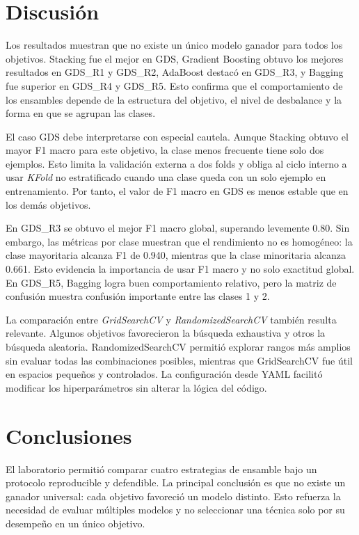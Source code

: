 \documentclass[conference]{IEEEtran}
\begin{document}
\section{Discusión}
Los resultados muestran que no existe un único modelo ganador para todos los objetivos. Stacking fue el mejor en GDS, Gradient Boosting obtuvo los mejores resultados en GDS\_R1 y GDS\_R2, AdaBoost destacó en GDS\_R3, y Bagging fue superior en GDS\_R4 y GDS\_R5. Esto confirma que el comportamiento de los ensambles depende de la estructura del objetivo, el nivel de desbalance y la forma en que se agrupan las clases.

El caso GDS debe interpretarse con especial cautela. Aunque Stacking obtuvo el mayor F1 macro para este objetivo, la clase menos frecuente tiene solo dos ejemplos. Esto limita la validación externa a dos folds y obliga al ciclo interno a usar \textit{KFold} no estratificado cuando una clase queda con un solo ejemplo en entrenamiento. Por tanto, el valor de F1 macro en GDS es menos estable que en los demás objetivos.

En GDS\_R3 se obtuvo el mejor F1 macro global, superando levemente 0.80. Sin embargo, las métricas por clase muestran que el rendimiento no es homogéneo: la clase mayoritaria alcanza F1 de 0.940, mientras que la clase minoritaria alcanza 0.661. Esto evidencia la importancia de usar F1 macro y no solo exactitud global. En GDS\_R5, Bagging logra buen comportamiento relativo, pero la matriz de confusión muestra confusión importante entre las clases 1 y 2.

La comparación entre \textit{GridSearchCV} y \textit{RandomizedSearchCV} también resulta relevante. Algunos objetivos favorecieron la búsqueda exhaustiva y otros la búsqueda aleatoria. RandomizedSearchCV permitió explorar rangos más amplios sin evaluar todas las combinaciones posibles, mientras que GridSearchCV fue útil en espacios pequeños y controlados. La configuración desde YAML facilitó modificar los hiperparámetros sin alterar la lógica del código.

\section{Conclusiones}
El laboratorio permitió comparar cuatro estrategias de ensamble bajo un protocolo reproducible y defendible. La principal conclusión es que no existe un ganador universal: cada objetivo favoreció un modelo distinto. Esto refuerza la necesidad de evaluar múltiples modelos y no seleccionar una técnica solo por su desempeño en un único objetivo.
\end{document}
